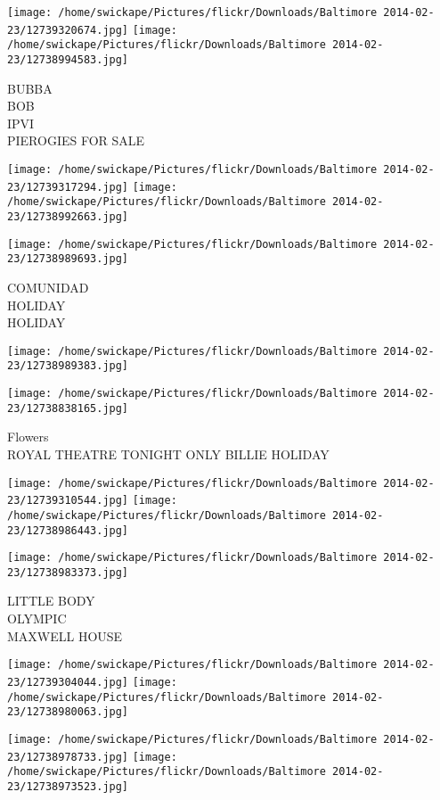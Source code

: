 \documentclass[10pt,letterpaper]{article}
\begin{document}
\texttt{[image: /home/swickape/Pictures/flickr/Downloads/Baltimore 2014-02-23/12739320674.jpg]}
\texttt{[image: /home/swickape/Pictures/flickr/Downloads/Baltimore 2014-02-23/12738994583.jpg]}

BUBBA\\
BOB\\
IPVI\\
PIEROGIES FOR SALE
\pagebreak

\texttt{[image: /home/swickape/Pictures/flickr/Downloads/Baltimore 2014-02-23/12739317294.jpg]}
\texttt{[image: /home/swickape/Pictures/flickr/Downloads/Baltimore 2014-02-23/12738992663.jpg]}

\texttt{[image: /home/swickape/Pictures/flickr/Downloads/Baltimore 2014-02-23/12738989693.jpg]}

COMUNIDAD\\
HOLIDAY\\
HOLIDAY
\pagebreak

\texttt{[image: /home/swickape/Pictures/flickr/Downloads/Baltimore 2014-02-23/12738989383.jpg]}

\vspace{0.25in}
\texttt{[image: /home/swickape/Pictures/flickr/Downloads/Baltimore 2014-02-23/12738838165.jpg]}

Flowers\\
ROYAL THEATRE TONIGHT ONLY BILLIE HOLIDAY
\pagebreak

\texttt{[image: /home/swickape/Pictures/flickr/Downloads/Baltimore 2014-02-23/12739310544.jpg]}
\texttt{[image: /home/swickape/Pictures/flickr/Downloads/Baltimore 2014-02-23/12738986443.jpg]}

\vspace{0.25in}
\texttt{[image: /home/swickape/Pictures/flickr/Downloads/Baltimore 2014-02-23/12738983373.jpg]}

LITTLE BODY\\
OLYMPIC\\
MAXWELL HOUSE
\pagebreak

\texttt{[image: /home/swickape/Pictures/flickr/Downloads/Baltimore 2014-02-23/12739304044.jpg]}
\texttt{[image: /home/swickape/Pictures/flickr/Downloads/Baltimore 2014-02-23/12738980063.jpg]}

\texttt{[image: /home/swickape/Pictures/flickr/Downloads/Baltimore 2014-02-23/12738978733.jpg]}
\texttt{[image: /home/swickape/Pictures/flickr/Downloads/Baltimore 2014-02-23/12738973523.jpg]}
\end{document}
